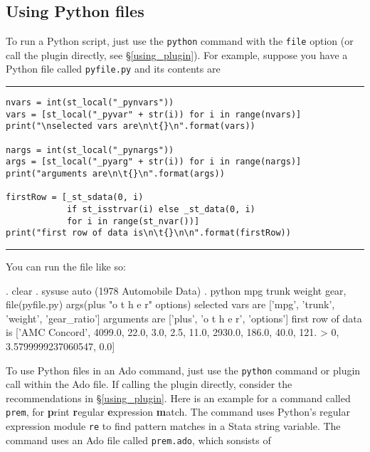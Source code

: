 \documentclass{article}
\begin{document}
\subsection{Using Python files} \label{fileexample}

To run a Python script, just use the \lstinline{python} command with the \lstinline{file} option (or call the plugin directly, see \S\ref{using_plugin}). For example, suppose you have a Python file called \lstinline$pyfile.py$ and its contents are \newline

\hrule
{\small
\begin{lstlisting}
nvars = int(st_local("_pynvars"))
vars = [st_local("_pyvar" + str(i)) for i in range(nvars)]
print("\nselected vars are\n\t{}\n".format(vars))
    
nargs = int(st_local("_pynargs"))
args = [st_local("_pyarg" + str(i)) for i in range(nargs)]
print("arguments are\n\t{}\n".format(args))

firstRow = [_st_sdata(0, i) 
            if st_isstrvar(i) else _st_data(0, i) 
            for i in range(st_nvar())]
print("first row of data is\n\t{}\n\n".format(firstRow))
\end{lstlisting}}
\hrule
\vspace{3mm}

\noindent You can run the file like so:

\begin{stlog}
{\smallskip}
. clear
{\smallskip}
. sysuse auto
(1978 Automobile Data)
{\smallskip}
. python mpg trunk weight gear, file(pyfile.py) args(plus "o t h e r" options)
{\smallskip}
{\smallskip}
selected vars are
        ['mpg', 'trunk', 'weight', 'gear_ratio']
{\smallskip}
{\smallskip}
arguments are
        ['plus', 'o t h e r', 'options']
{\smallskip}
{\smallskip}
first row of data is
        ['AMC Concord', 4099.0, 22.0, 3.0, 2.5, 11.0, 2930.0, 186.0, 40.0, 121.
> 0, 3.5799999237060547, 0.0]
{\smallskip}
{\smallskip}
\end{stlog}

\vspace{3mm}
To use Python files in an Ado command, just use the \lstinline{python} command or plugin call within the Ado file. If calling the plugin directly, consider the recommendations in \S\ref{using_plugin}. Here is an example for a command called \lstinline{prem}, for \textbf{p}rint \textbf{r}egular \textbf{e}xpression \textbf{m}atch. The command uses Python's regular expression module \lstinline{re} to find pattern matches in a Stata string variable. The command uses an Ado file called \lstinline{prem.ado}, which sonsists of\newline
\end{document}
